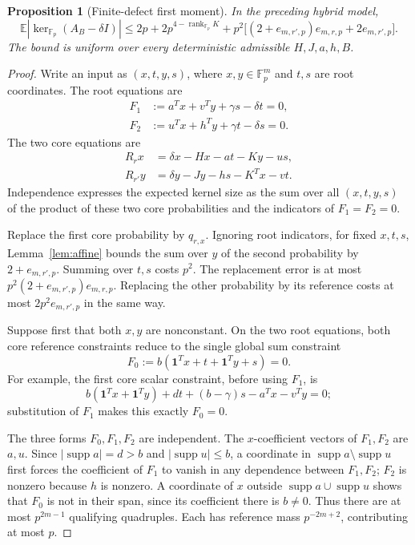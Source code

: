 \documentclass[11pt]{article}
\newtheorem{proposition}{Proposition}
\newcommand{\Fp}{\mathbb F_p}
\newcommand{\one}{\mathbf1}
\newcommand{\rank}{\operatorname{rank}}
\newcommand{\E}{\mathbb E}
\begin{document}
\begin{proposition}[Finite-defect first moment]\label{prop:hybrid}
In the preceding hybrid model,
\[
 \E|\ker_{\Fp}(A_B-\delta I)|
 \le2p+2p^{4-\rank_{\Fp}K}
 +p^2\bigl[(2+e_{m,r',p})e_{m,r,p}+2e_{m,r',p}\bigr].
\]
The bound is uniform over every deterministic admissible $H,J,a,h,B$.
\end{proposition}
\begin{proof}
Write an input as $(x,t,y,s)$, where $x,y\in\Fp^m$ and $t,s$ are root
coordinates. The root equations are
\begin{align*}
 F_1&:=a^Tx+v^Ty+\gamma s-\delta t=0,\\
 F_2&:=u^Tx+h^Ty+\gamma t-\delta s=0.
\end{align*}
The two core equations are
\begin{align*}
 R_rx&=\delta x-Hx-at-Ky-us,\\
 R_{r'}y&=\delta y-Jy-hs-K^Tx-vt.
\end{align*}
Independence expresses the expected kernel size as the sum over all
$(x,t,y,s)$ of the product of these two core probabilities and the
indicators of $F_1=F_2=0$.

Replace the first core probability by $q_{r,x}$. Ignoring root
indicators, for fixed $x,t,s$, Lemma~\ref{lem:affine} bounds the sum
over $y$ of the second probability by $2+e_{m,r',p}$. Summing over
$t,s$ costs $p^2$. The replacement error is at most
$p^2(2+e_{m,r',p})e_{m,r,p}$. Replacing the other probability by its
reference costs at most $2p^2e_{m,r',p}$ in the same way.

Suppose first that both $x,y$ are nonconstant. On the two root
equations, both core reference constraints reduce to the single
global sum constraint
\[
 F_0:=b(\one^Tx+t+\one^Ty+s)=0.
\]
For example, the first core scalar constraint, before using $F_1$, is
\[
 b(\one^Tx+\one^Ty)+dt+(b-\gamma)s-a^Tx-v^Ty=0;
\]
substitution of $F_1$ makes this exactly $F_0=0$.

The three forms $F_0,F_1,F_2$ are independent. The $x$-coefficient
vectors of $F_1,F_2$ are $a,u$. Since $|\operatorname{supp}a|=d>b$
and $|\operatorname{supp}u|\le b$, a coordinate in
$\operatorname{supp}a\setminus\operatorname{supp}u$ first forces the
coefficient of $F_1$ to vanish in any dependence between $F_1,F_2$;
$F_2$ is nonzero because $h$ is nonzero. A coordinate of $x$ outside
$\operatorname{supp}a\cup\operatorname{supp}u$ shows that $F_0$ is
not in their span, since its coefficient there is $b\ne0$.
Thus there are at most $p^{2m-1}$ qualifying quadruples. Each has
reference mass $p^{-2m+2}$, contributing at most $p$.


\end{proof}
\end{document}
